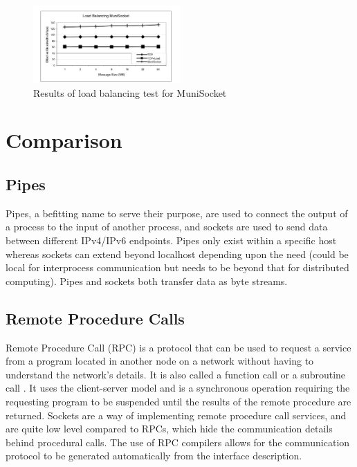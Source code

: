 \documentclass[conference, 12pt]{IEEEtran}
\begin{document}
\begin{figure}[htbp]
    \centering
    \centerline{\includegraphics[width=0.5\textwidth]{Figure7.png}}
    \caption{Results of load balancing test for MuniSocket \cite{mohamed2002user}}
    \label{Figure7}
\end{figure}

\section{Comparison}
\subsection{Pipes}
Pipes, a befitting name to serve their purpose, are used to connect the output of a process to the input of another process, and sockets are used to send data between different IPv4/IPv6 endpoints. Pipes only exist within a specific host whereas sockets can extend beyond localhost depending upon the need (could be local for interprocess communication but needs to be beyond that for distributed computing). Pipes and sockets both transfer data as byte streams.

\subsection{Remote Procedure Calls}
Remote Procedure Call (RPC) is a protocol that can be used to request a service from a program located in another node on a network without having to understand the network’s details. It is also called a function call or a subroutine call \cite{techtarget_2016}. It uses the client-server model and is a synchronous operation requiring the requesting program to be suspended until the results of the remote procedure are returned. Sockets are a way of implementing remote procedure call services, and are quite low level compared to RPCs, which hide the communication details behind procedural calls. The use of RPC compilers allows for the communication protocol to be generated automatically from the interface description.
\end{document}

